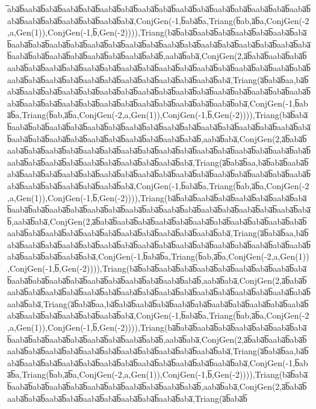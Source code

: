 ̅aba̅b̅aaba̅b̅aba̅b̅aaba̅b̅aba̅b̅aaba̅b̅aba̅b̅aaba̅b̅aba̅b̅aaba̅b̅aba̅b̅aaba̅b̅aba̅b̅aaba̅b̅aba̅b̅aaba̅b̅aba̅b̅aaba̅b̅aba̅b̅aaba̅b̅aba̅b̅aaba̅b̅aba̅,ConjGen(-1,b̅aba̅b̅a,Triang(b̅ab,a̅b̅a,ConjGen(-2,a,Gen(1)),ConjGen(-1,b̅,Gen(-2)))),Triang(ba̅b̅aba̅b̅aaba̅b̅aba̅b̅aaba̅b̅aba̅b̅aaba̅b̅aba̅b̅aaba̅b̅aba̅b̅aaba̅b̅aba̅b̅aaba̅b̅aba̅b̅aaba̅b̅aba̅b̅aaba̅b̅aba̅b̅aaba̅b̅aba̅b̅aaba̅b̅aba̅b̅aaba̅b̅aba̅b̅aaba̅b̅aba̅b̅aaba̅b̅aba̅b̅aaba̅b̅aba̅b̅aaba̅b̅aba̅b̅,aaba̅b̅aba̅,ConjGen(2,a̅b̅aba̅b̅aaba̅b̅aba̅b̅aaba̅b̅aba̅b̅aaba̅b̅aba̅b̅aaba̅b̅aba̅b̅aaba̅b̅aba̅b̅aaba̅b̅aba̅b̅aaba̅b̅aba̅b̅aaba̅b̅aba̅b̅aaba̅b̅aba̅b̅aaba̅b̅aba̅b̅aaba̅b̅aba̅b̅aaba̅b̅aba̅b̅aaba̅b̅aba̅b̅aaba̅b̅aba̅b̅aaba̅b̅aba̅,Triang(a̅b̅aba̅b̅aa,ba̅b̅aba̅b̅aaba̅b̅aba̅b̅aaba̅b̅aba̅b̅aaba̅b̅aba̅b̅aaba̅b̅aba̅b̅aaba̅b̅aba̅b̅aaba̅b̅aba̅b̅aaba̅b̅aba̅b̅aaba̅b̅aba̅b̅aaba̅b̅aba̅b̅aaba̅b̅aba̅b̅aaba̅b̅aba̅b̅aaba̅b̅aba̅b̅aaba̅b̅aba̅b̅aaba̅b̅aba̅,ConjGen(-1,b̅aba̅b̅a,Triang(b̅ab,a̅b̅a,ConjGen(-2,a,Gen(1)),ConjGen(-1,b̅,Gen(-2)))),Triang(ba̅b̅aba̅b̅aaba̅b̅aba̅b̅aaba̅b̅aba̅b̅aaba̅b̅aba̅b̅aaba̅b̅aba̅b̅aaba̅b̅aba̅b̅aaba̅b̅aba̅b̅aaba̅b̅aba̅b̅aaba̅b̅aba̅b̅aaba̅b̅aba̅b̅aaba̅b̅aba̅b̅aaba̅b̅aba̅b̅aaba̅b̅aba̅b̅aaba̅b̅aba̅b̅,aaba̅b̅aba̅,ConjGen(2,a̅b̅aba̅b̅aaba̅b̅aba̅b̅aaba̅b̅aba̅b̅aaba̅b̅aba̅b̅aaba̅b̅aba̅b̅aaba̅b̅aba̅b̅aaba̅b̅aba̅b̅aaba̅b̅aba̅b̅aaba̅b̅aba̅b̅aaba̅b̅aba̅b̅aaba̅b̅aba̅b̅aaba̅b̅aba̅b̅aaba̅b̅aba̅b̅aaba̅b̅aba̅,Triang(a̅b̅aba̅b̅aa,ba̅b̅aba̅b̅aaba̅b̅aba̅b̅aaba̅b̅aba̅b̅aaba̅b̅aba̅b̅aaba̅b̅aba̅b̅aaba̅b̅aba̅b̅aaba̅b̅aba̅b̅aaba̅b̅aba̅b̅aaba̅b̅aba̅b̅aaba̅b̅aba̅b̅aaba̅b̅aba̅b̅aaba̅b̅aba̅b̅aaba̅b̅aba̅,ConjGen(-1,b̅aba̅b̅a,Triang(b̅ab,a̅b̅a,ConjGen(-2,a,Gen(1)),ConjGen(-1,b̅,Gen(-2)))),Triang(ba̅b̅aba̅b̅aaba̅b̅aba̅b̅aaba̅b̅aba̅b̅aaba̅b̅aba̅b̅aaba̅b̅aba̅b̅aaba̅b̅aba̅b̅aaba̅b̅aba̅b̅aaba̅b̅aba̅b̅aaba̅b̅aba̅b̅aaba̅b̅aba̅b̅aaba̅b̅aba̅b̅aaba̅b̅aba̅b̅,aaba̅b̅aba̅,ConjGen(2,a̅b̅aba̅b̅aaba̅b̅aba̅b̅aaba̅b̅aba̅b̅aaba̅b̅aba̅b̅aaba̅b̅aba̅b̅aaba̅b̅aba̅b̅aaba̅b̅aba̅b̅aaba̅b̅aba̅b̅aaba̅b̅aba̅b̅aaba̅b̅aba̅b̅aaba̅b̅aba̅b̅aaba̅b̅aba̅,Triang(a̅b̅aba̅b̅aa,ba̅b̅aba̅b̅aaba̅b̅aba̅b̅aaba̅b̅aba̅b̅aaba̅b̅aba̅b̅aaba̅b̅aba̅b̅aaba̅b̅aba̅b̅aaba̅b̅aba̅b̅aaba̅b̅aba̅b̅aaba̅b̅aba̅b̅aaba̅b̅aba̅b̅aaba̅b̅aba̅,ConjGen(-1,b̅aba̅b̅a,Triang(b̅ab,a̅b̅a,ConjGen(-2,a,Gen(1)),ConjGen(-1,b̅,Gen(-2)))),Triang(ba̅b̅aba̅b̅aaba̅b̅aba̅b̅aaba̅b̅aba̅b̅aaba̅b̅aba̅b̅aaba̅b̅aba̅b̅aaba̅b̅aba̅b̅aaba̅b̅aba̅b̅aaba̅b̅aba̅b̅aaba̅b̅aba̅b̅aaba̅b̅aba̅b̅,aaba̅b̅aba̅,ConjGen(2,a̅b̅aba̅b̅aaba̅b̅aba̅b̅aaba̅b̅aba̅b̅aaba̅b̅aba̅b̅aaba̅b̅aba̅b̅aaba̅b̅aba̅b̅aaba̅b̅aba̅b̅aaba̅b̅aba̅b̅aaba̅b̅aba̅b̅aaba̅b̅aba̅,Triang(a̅b̅aba̅b̅aa,ba̅b̅aba̅b̅aaba̅b̅aba̅b̅aaba̅b̅aba̅b̅aaba̅b̅aba̅b̅aaba̅b̅aba̅b̅aaba̅b̅aba̅b̅aaba̅b̅aba̅b̅aaba̅b̅aba̅b̅aaba̅b̅aba̅,ConjGen(-1,b̅aba̅b̅a,Triang(b̅ab,a̅b̅a,ConjGen(-2,a,Gen(1)),ConjGen(-1,b̅,Gen(-2)))),Triang(ba̅b̅aba̅b̅aaba̅b̅aba̅b̅aaba̅b̅aba̅b̅aaba̅b̅aba̅b̅aaba̅b̅aba̅b̅aaba̅b̅aba̅b̅aaba̅b̅aba̅b̅aaba̅b̅aba̅b̅,aaba̅b̅aba̅,ConjGen(2,a̅b̅aba̅b̅aaba̅b̅aba̅b̅aaba̅b̅aba̅b̅aaba̅b̅aba̅b̅aaba̅b̅aba̅b̅aaba̅b̅aba̅b̅aaba̅b̅aba̅b̅aaba̅b̅aba̅,Triang(a̅b̅aba̅b̅aa,ba̅b̅aba̅b̅aaba̅b̅aba̅b̅aaba̅b̅aba̅b̅aaba̅b̅aba̅b̅aaba̅b̅aba̅b̅aaba̅b̅aba̅b̅aaba̅b̅aba̅,ConjGen(-1,b̅aba̅b̅a,Triang(b̅ab,a̅b̅a,ConjGen(-2,a,Gen(1)),ConjGen(-1,b̅,Gen(-2)))),Triang(ba̅b̅aba̅b̅aaba̅b̅aba̅b̅aaba̅b̅aba̅b̅aaba̅b̅aba̅b̅aaba̅b̅aba̅b̅aaba̅b̅aba̅b̅,aaba̅b̅aba̅,ConjGen(2,a̅b̅aba̅b̅aaba̅b̅aba̅b̅aaba̅b̅aba̅b̅aaba̅b̅aba̅b̅aaba̅b̅aba̅b̅aaba̅b̅aba̅,Triang(a̅b̅aba̅b̅